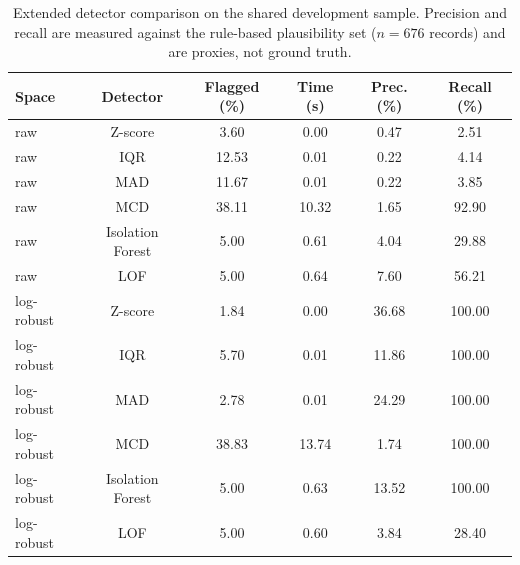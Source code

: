 \begin{table}[!t]
\caption{Extended detector comparison on the shared development sample. Precision and recall are measured against the rule-based plausibility set ($n=676$ records) and are proxies, not ground truth.}
\label{tab:ext_detectors}
\centering
\setlength{\tabcolsep}{3pt}
\footnotesize
\begin{tabular}{lccccc}
\hline
Space & Detector & Flagged (\%) & Time (s) & Prec. (\%) & Recall (\%) \\
\hline
raw & Z-score & 3.60 & 0.00 & 0.47 & 2.51 \\
raw & IQR & 12.53 & 0.01 & 0.22 & 4.14 \\
raw & MAD & 11.67 & 0.01 & 0.22 & 3.85 \\
raw & MCD & 38.11 & 10.32 & 1.65 & 92.90 \\
raw & Isolation Forest & 5.00 & 0.61 & 4.04 & 29.88 \\
raw & LOF & 5.00 & 0.64 & 7.60 & 56.21 \\
log-robust & Z-score & 1.84 & 0.00 & 36.68 & 100.00 \\
log-robust & IQR & 5.70 & 0.01 & 11.86 & 100.00 \\
log-robust & MAD & 2.78 & 0.01 & 24.29 & 100.00 \\
log-robust & MCD & 38.83 & 13.74 & 1.74 & 100.00 \\
log-robust & Isolation Forest & 5.00 & 0.63 & 13.52 & 100.00 \\
log-robust & LOF & 5.00 & 0.60 & 3.84 & 28.40 \\
\hline
\end{tabular}
\end{table}